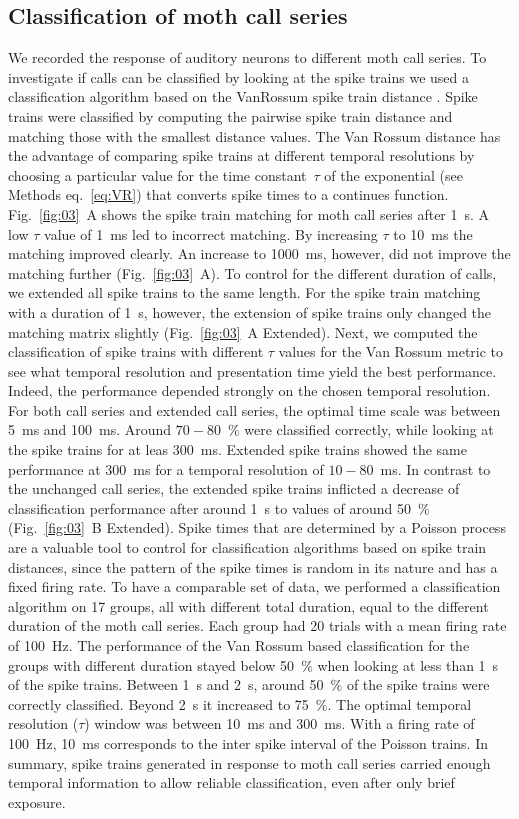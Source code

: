 \documentclass[12pt,a4paper]{article}
\newcommand{\fig}[2]{(Fig.~#1~#2)}
\newcommand{\percent}[1]{#1~$\%$}
\begin{document}
\subsection{Classification of moth call series}
\label{mothcalls}
We recorded the response of auditory neurons to different moth call series. To investigate if calls can be classified by looking at the spike trains we used a classification algorithm based on the VanRossum spike train distance \parencite{vanrossum_novel_2001}. Spike trains were classified by computing the pairwise spike train distance and matching those with the smallest distance values. The Van Rossum distance has the advantage of comparing spike trains at different temporal resolutions by choosing a particular value for the time constant~$\tau$ of the exponential (see Methods eq.~\ref{eq:VR}) that converts spike times to a continues function. Fig.~\ref{fig:03}~A shows the spike train matching for moth call series after 1~s. A low $\tau$ value of 1~ms led to incorrect matching. By increasing $\tau$ to 10~ms the matching improved clearly. An increase to 1000~ms, however, did not improve the matching further \fig{\ref{fig:03}}{A}. To control for the different duration of calls, we extended all spike trains to the same length. For the spike train matching with a duration of 1~s, however, the extension of spike trains only changed the matching matrix slightly \fig{\ref{fig:03}}{A Extended}. Next, we computed the classification of spike trains with different $ \tau $ values for the Van Rossum metric to see what temporal resolution and presentation time yield the best performance. Indeed, the performance depended strongly on the chosen temporal resolution. For both call series and extended call series, the optimal time scale was between 5~ms and 100~ms. Around \percent{$70-80$} were classified correctly, while looking at the spike trains for at leas 300~ms. Extended spike trains showed the same performance at 300~ms for a temporal resolution of $10-80$~ms. In contrast to the unchanged call series, the extended spike trains inflicted a decrease of classification performance after around 1~s to values of around \percent{50} \fig{\ref{fig:03}}{B Extended}. Spike times that are determined by a Poisson process are a valuable tool to control for classification algorithms based on spike train distances, since the pattern of the spike times is random in its nature and has a fixed firing rate. To have a comparable set of data, we performed a classification algorithm on 17 groups, all with different total duration, equal to the different duration of the moth call series. Each group had 20 trials with a mean firing rate of 100~Hz. The performance of the Van Rossum based classification for the groups with different duration stayed below \percent{50} when looking at less than 1~s of the spike trains. Between 1~s and 2~s, around \percent{50} of the spike trains were correctly classified. Beyond 2~s it increased to \percent{75}. The optimal temporal resolution ($ \tau $) window was between 10~ms and 300~ms. With a firing rate of 100~Hz, 10~ms corresponds to the inter spike interval of the Poisson trains. In summary, spike trains generated in response to moth call series carried enough temporal information to allow reliable classification, even after only brief exposure.
\end{document}
